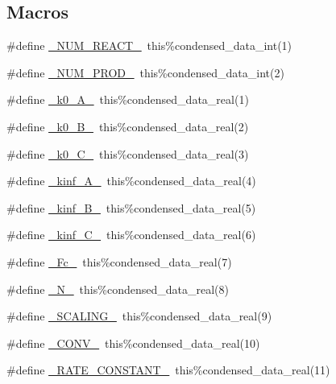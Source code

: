 \subsection*{Macros}
\begin{DoxyCompactItemize}
\item 
\#define \mbox{\hyperlink{rxn__troe_8_f90_aee1fee52189b85b8a55162815b7eb2ab}{\+\_\+\+N\+U\+M\+\_\+\+R\+E\+A\+C\+T\+\_\+}}~this\%condensed\+\_\+data\+\_\+int(1)
\item 
\#define \mbox{\hyperlink{rxn__troe_8_f90_a0ab2d7e00e334b5c52335f26ef6025e8}{\+\_\+\+N\+U\+M\+\_\+\+P\+R\+O\+D\+\_\+}}~this\%condensed\+\_\+data\+\_\+int(2)
\item 
\#define \mbox{\hyperlink{rxn__troe_8_f90_aabb54c582f3555126b59cb089e4be16c}{\+\_\+k0\+\_\+\+A\+\_\+}}~this\%condensed\+\_\+data\+\_\+real(1)
\item 
\#define \mbox{\hyperlink{rxn__troe_8_f90_a2e85b17924fcae4e8ac7d13cd5ad9dc3}{\+\_\+k0\+\_\+\+B\+\_\+}}~this\%condensed\+\_\+data\+\_\+real(2)
\item 
\#define \mbox{\hyperlink{rxn__troe_8_f90_a33edc6e996141c7b128a12cde9624602}{\+\_\+k0\+\_\+\+C\+\_\+}}~this\%condensed\+\_\+data\+\_\+real(3)
\item 
\#define \mbox{\hyperlink{rxn__troe_8_f90_a16389cfceed1fd69fe6b9458edd2e75c}{\+\_\+kinf\+\_\+\+A\+\_\+}}~this\%condensed\+\_\+data\+\_\+real(4)
\item 
\#define \mbox{\hyperlink{rxn__troe_8_f90_a886ee8272eb9397f53389b48628315d7}{\+\_\+kinf\+\_\+\+B\+\_\+}}~this\%condensed\+\_\+data\+\_\+real(5)
\item 
\#define \mbox{\hyperlink{rxn__troe_8_f90_affd58df6c9d0e5815142feea6ee9d177}{\+\_\+kinf\+\_\+\+C\+\_\+}}~this\%condensed\+\_\+data\+\_\+real(6)
\item 
\#define \mbox{\hyperlink{rxn__troe_8_f90_a2a0bc95e3e511fa8f724b60d3cb36a05}{\+\_\+\+Fc\+\_\+}}~this\%condensed\+\_\+data\+\_\+real(7)
\item 
\#define \mbox{\hyperlink{rxn__troe_8_f90_a0566484133b38e18c9c27c7d11cad8c6}{\+\_\+\+N\+\_\+}}~this\%condensed\+\_\+data\+\_\+real(8)
\item 
\#define \mbox{\hyperlink{rxn__troe_8_f90_a44b5bdc8cf91427e717c13d7c925db84}{\+\_\+\+S\+C\+A\+L\+I\+N\+G\+\_\+}}~this\%condensed\+\_\+data\+\_\+real(9)
\item 
\#define \mbox{\hyperlink{rxn__troe_8_f90_a8d22506f8671e195690022c44d319caf}{\+\_\+\+C\+O\+N\+V\+\_\+}}~this\%condensed\+\_\+data\+\_\+real(10)
\item 
\#define \mbox{\hyperlink{rxn__troe_8_f90_a90fa57a01e99ca76df9ef2ac521667ec}{\+\_\+\+R\+A\+T\+E\+\_\+\+C\+O\+N\+S\+T\+A\+N\+T\+\_\+}}~this\%condensed\+\_\+data\+\_\+real(11)

\end{DoxyCompactItemize}
